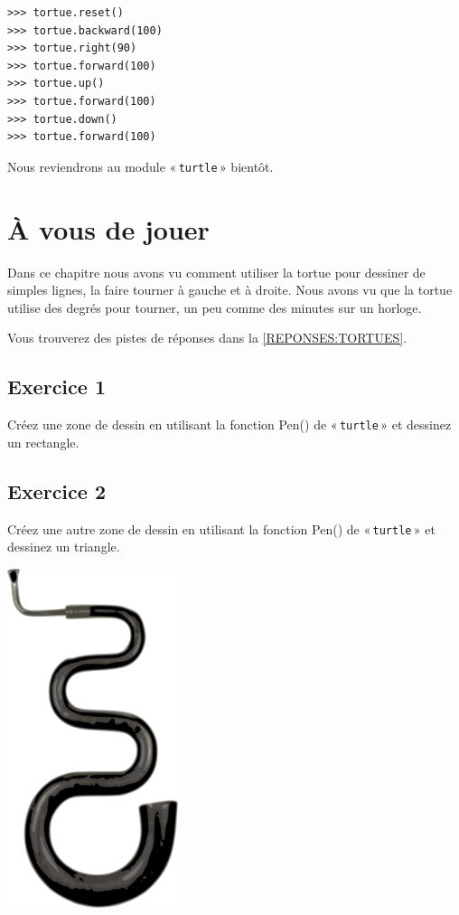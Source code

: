 \begin{Verbatim}[frame=single,rulecolor=\color{mbleu}, label=à taper]
>>> tortue.reset()
>>> tortue.backward(100)
>>> tortue.right(90)
>>> tortue.forward(100)
>>> tortue.up()
>>> tortue.forward(100)
>>> tortue.down()
>>> tortue.forward(100)
\end{Verbatim}

Nous reviendrons au module « \texttt{turtle} »  bientôt.

\section{À vous de jouer}\label{PRATIQUE:TORTUES}
Dans ce chapitre nous avons vu comment utiliser la tortue pour dessiner de simples lignes, la faire tourner à gauche et à droite. Nous avons vu que la tortue utilise des degrés pour tourner, un peu comme des minutes sur un horloge.

Vous trouverez des pistes de réponses dans la \autoref{REPONSES:TORTUES}.
\subsection*{Exercice 1}
Créez une zone de dessin en utilisant la fonction Pen() de « \texttt{turtle} » et dessinez un rectangle.
\subsection*{Exercice 2}
Créez une autre zone de dessin en utilisant la fonction Pen() de « \texttt{turtle} » et dessinez un triangle.
 \vfill
\begin{center}
 \includegraphics[width=5cm]{images/sem.pdf}
\end{center}
 \vfill

\clearemptydoublepage
